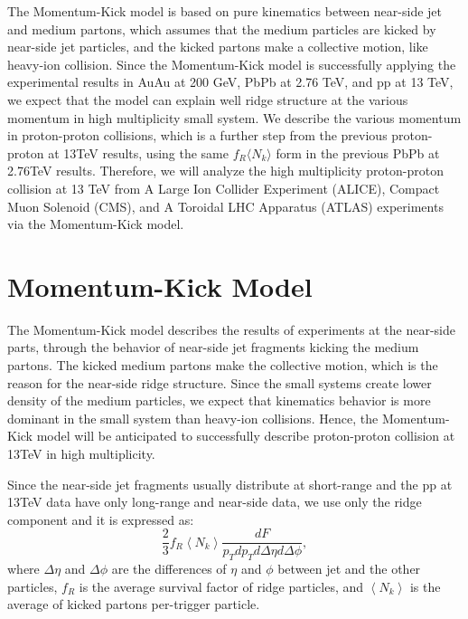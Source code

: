 \documentclass[jkps,fleqn,showpacs,showkeys]{revtex4}
\begin{document}
The Momentum-Kick model\cite{Wong_2, Wong_3, Wong_4, Wong_5} is based on pure kinematics between near-side jet and medium partons, which assumes that the medium particles are kicked by near-side jet particles, and the kicked partons make a collective motion, like heavy-ion collision.
Since the Momentum-Kick model is successfully applying the experimental results in AuAu at 200 GeV\cite{Wong_1}, PbPb at 2.76 TeV\cite{PbPb}, and pp at 13 TeV\cite{Hanul}, we expect that the model can explain well ridge structure at the various momentum in high multiplicity small system.
We describe the various momentum in proton-proton collisions, which is a further step from the previous proton-proton at 13TeV results\cite{Hanul}, using the same $f_R \langle N_k \rangle$ form in the previous PbPb at 2.76TeV results\cite{PbPb}.
Therefore, we will analyze the high multiplicity proton-proton collision at 13 TeV from A Large Ion Collider Experiment (ALICE), Compact Muon Solenoid (CMS), and A Toroidal LHC Apparatus (ATLAS) experiments via the Momentum-Kick model\cite{alice,cms,atlas}.

\section*{Momentum-Kick Model}
\label{sec:Momentum-Kick Model}

The Momentum-Kick model describes the results of experiments at the near-side parts, through the behavior of near-side jet fragments kicking the medium partons.
The kicked medium partons make the collective motion, which is the reason for the near-side ridge structure.
Since the small systems create lower density of the medium particles, we expect that kinematics behavior is more dominant in the small system than heavy-ion collisions.
Hence, the Momentum-Kick model will be anticipated to successfully describe proton-proton collision at 13TeV in high multiplicity.


Since the near-side jet fragments usually distribute at short-range and the pp at 13TeV data have only long-range and near-side data, we use only the ridge component and it is expressed as:
\begin{equation} \label{equation:eq1}
\frac{2}{3} f_R\left\langle N_k\right\rangle \frac{dF}{p_T dp_T d\Delta\eta d\Delta\phi},
\end{equation}
where $\Delta \eta $ and $\Delta \phi$ are the differences of $\eta$ and $\phi$ between jet and the other particles, $f_R$ is the average survival factor of ridge particles, and $\left\langle N_k\right\rangle$ is the average of kicked partons per-trigger particle.
\end{document}
